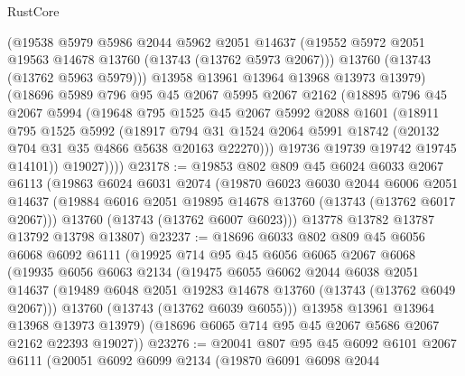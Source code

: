\begin{lexlean}{RustCore}
\begin{coremodule}
            (@19538
              @5979
              @5986
              @2044
              @5962
              @2051
              @14637
              (@19552 @5972 @2051 @19563 @14678 @13760 (@13743 (@13762 @5973 @2067)))
              @13760
              (@13743 (@13762 @5963 @5979)))
            @13958
            @13961
            @13964
            @13968
            @13973
            @13979)
          (@18696
            @5989
            @796
            @95
            @45
            @2067
            @5995
            @2067
            @2162
            (@18895
              @796
              @45
              @2067
              @5994
              (@19648
                @795
                @1525
                @45
                @2067
                @5992
                @2088
                @1601
                (@18911
                  @795
                  @1525
                  @5992
                  (@18917
                    @794
                    @31
                    @1524
                    @2064
                    @5991
                    @18742
                    (@20132 @704 @31 @35 @4866 @5638 @20163 @22270)))
                @19736
                @19739
                @19742
                @19745
                @14101))
            @19027))))
@23178 := @19853
    @802
    @809
    @45
    @6024
    @6033
    @2067
    @6113
    (@19863
      @6024
      @6031
      @2074
      (@19870
        @6023
        @6030
        @2044
        @6006
        @2051
        @14637
        (@19884 @6016 @2051 @19895 @14678 @13760 (@13743 (@13762 @6017 @2067)))
        @13760
        (@13743 (@13762 @6007 @6023)))
      @13778
      @13782
      @13787
      @13792
      @13798
      @13807)
@23237 := @18696
    @6033
    @802
    @809
    @45
    @6056
    @6068
    @6092
    @6111
    (@19925
      @714
      @95
      @45
      @6056
      @6065
      @2067
      @6068
      (@19935
        @6056
        @6063
        @2134
        (@19475
          @6055
          @6062
          @2044
          @6038
          @2051
          @14637
          (@19489 @6048 @2051 @19283 @14678 @13760 (@13743 (@13762 @6049 @2067)))
          @13760
          (@13743 (@13762 @6039 @6055)))
        @13958
        @13961
        @13964
        @13968
        @13973
        @13979)
      (@18696 @6065 @714 @95 @45 @2067 @5686 @2067 @2162 @22393 @19027))
@23276 := @20041
    @807
    @95
    @45
    @6092
    @6101
    @2067
    @6111
    (@20051
      @6092
      @6099
      @2134
      (@19870
        @6091
        @6098
        @2044

\end{coremodule}
\end{lexlean}
